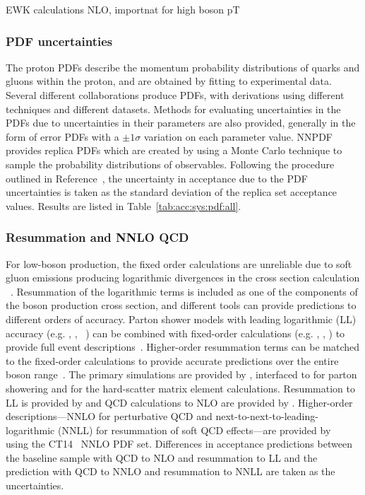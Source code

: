 EWK calculations NLO, importnat for high boson pT
~\cite{Dittmaier:2014qza,Lindert:2017olm}


\subsubsection{PDF uncertainties}
The proton PDFs describe the momentum probability distributions of quarks and gluons within the proton, and are obtained by fitting to experimental data. Several different collaborations produce PDFs, with derivations using different techniques and different datasets. Methods for evaluating uncertainties in the PDFs due to uncertainties in their parameters are also provided, generally in the form of error PDFs with a $\pm 1 \sigma$ variation on each parameter value. NNPDF provides replica PDFs which are created by using a Monte Carlo technique to sample the probability distributions of observables. Following the procedure outlined in Reference~\cite{Butterworth:2015oua}, the uncertainty in acceptance due to the PDF uncertainties is taken as the standard deviation of the replica set acceptance values. Results are listed in Table~\ref{tab:acc:sys:pdf:all}.

\subsubsection{Resummation and NNLO QCD}
For low-\pt boson production, the fixed order calculations are unreliable due to soft gluon emissions producing logarithmic divergences in the cross section calculation
~\cite{Collins:1984kg}. Resummation of the logarithmic terms is included as one of the components of the boson production cross section, and different tools can provide predictions to different orders of accuracy. Parton shower models with leading logarithmic (LL) accuracy (e.g. \PYTHIA, \SHERPA, \HERWIG ~\cite{Sjostrand:2014zea,Gleisberg:2008ta,Bahr:2008pv}) can be combined with fixed-order calculations (e.g. \aMCATNLO, \MINLO, \POWHEG) to provide full event descriptions~\cite{Nason:2004rx,Frixione:2002ik,Alioli:2010xd,Alwall:2014hca}. Higher-order resummation terms can be matched to the fixed-order calculations to provide accurate predictions over the entire boson \pt range~\cite{Balazs:1995nz,Catani:2015vma}. 
The primary simulations are provided by \aMCATNLO, interfaced to  for parton showering and  for the hard-scatter matrix element calculations. Resummation to LL is provided by  and QCD calculations to NLO are provided by . Higher-order descriptions---NNLO for perturbative QCD and next-to-next-to-leading-logarithmic (NNLL) for resummation of soft QCD effects---are provided by \RESBOS~\cite{Ladinsky:1993zn, Balazs:1997xd, Landry:2002ix} using the CT14~\cite{Dulat:2015mca} NNLO PDF set.  Differences in acceptance predictions between the baseline sample with QCD to NLO and resummation to LL and the \RESBOS prediction with QCD to NNLO and resummation to NNLL are taken as the uncertainties.

